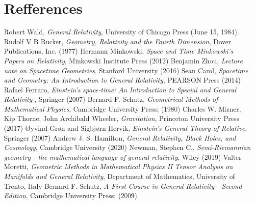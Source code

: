 \documentclass[11pt,a4paper]{article}
\begin{document}
	\section{Refferences}
	\begin{thebibliography}{9}
		\setlength{\itemindent}{.2in}
		Robert Wald, \emph{General Relativity}, University of Chicago Press (June 15, 1984).
		Rudolf V B Rucker, \emph{Geometry, Relativity and the Fourth Dimension}, Dover Publications, Inc. (1977)
		Hermann Minkowski, \emph{Space and Time Minkowski’s Papers on Relativity}, Minkowski Institute Press (2012)
		Benjamin Zhou, \emph{Lecture note on Spacetime Geometries}, Stanford University (2016)
		Sean Carol, \emph{Spacetime and Geometry: An Introduction to General Relativity}, PEARSON Press (2014)
		Rafael Ferraro, \emph{Einstein's space-time: An Introduction to Special and General Relativity }, Springer (2007)
		Bernard F. Schutz, \emph{Geometrical Methods of Mathematical Physics}, Cambridge University Press; (1980)
		Charles W. Misner, Kip Thorne, John Archibald Wheeler, \emph{Gravitation}, Princeton University Press (2017)
		Øyvind Grøn and Sigbjørn Hervik, \emph{Einstein's General Theory of Relative}, Springer (2007)
		Andrew J. S. Hamilton, \emph{General Relativity, Black Holes, and Cosmology}, Cambridge University (2020)
		Newman, Stephen C., \emph{Semi-Riemannian geometry - the mathematical language of general relativity}, Wiley (2019)
		Valter Moretti, \emph{Geometric Methods in Mathematical Physics II Tensor Analysis on Manifolds and General Relativity}, Department of Mathematics, University of Trento, Italy
		Bernard F. Schutz, \emph{A First Course in General Relativity - Second Edition}, Cambridge University Press; (2009)
		
	\end{thebibliography}
\end{document}
